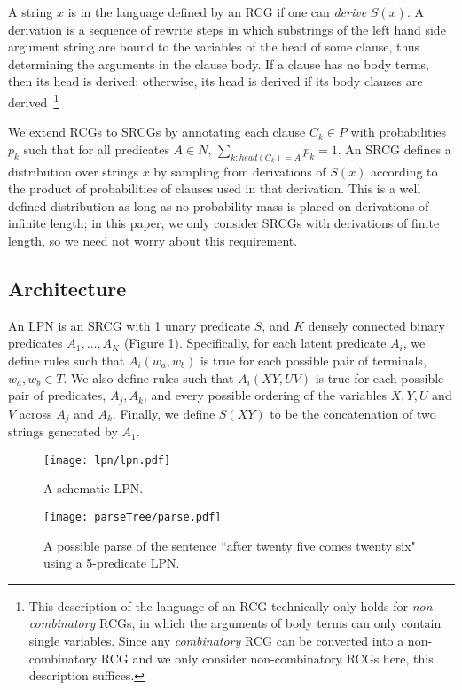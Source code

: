 \documentclass[11pt, twocolumn]{article}
\begin{document}
A string $x$ is in the language defined by an RCG if one can
\emph{derive} $S(x)$. A derivation is a sequence of rewrite steps in
which substrings of the left hand side argument string are bound to
the variables of the head of some clause, thus determining the
arguments in the clause body. If a clause has no body terms, then its
head is derived; otherwise, its head is derived if its body clauses
are derived~\footnote{This description of the language of an RCG
  technically only holds for \emph{non-combinatory} RCGs, in which the
  arguments of body terms can only contain single variables. Since any
  \emph{combinatory} RCG can be converted into a non-combinatory RCG
  and we only consider non-combinatory RCGs here, this description
  suffices.}

We extend RCGs to SRCGs by annotating each clause $C_k \in P$ with
probabilities $p_k$ such that for all predicates ${A \in N, \,
  \sum_{k:head(C_k)=A} p_k = 1}$. An SRCG defines a distribution over
strings $x$ by sampling from derivations of $S(x)$ according to the
product of probabilities of clauses used in that derivation. This is a
well defined distribution as long as no probability mass is placed on
derivations of infinite length; in this paper, we only consider SRCGs
with derivations of finite length, so we need not worry about this
requirement.

\subsection{Architecture}

An LPN is an SRCG with 1 unary predicate $S$, and $K$ densely
connected binary predicates $A_1, \dots, A_K$ (Figure
\ref{fig:architecture}).  Specifically, for each latent predicate
$A_i$, we define rules such that $A_i(w_a,w_b)$ is true for each
possible pair of terminals, $w_a,w_b \in T$. We also define rules such
that $A_i(XY,UV)$ is true for each possible pair of predicates,
$A_j,A_k$, and every possible ordering of the variables $X,Y,U$ and
$V$ across $A_j$ and $A_k$. Finally, we define $S(XY)$ to be the
concatenation of two strings generated by $A_1$.
 
\begin{figure}[t]
		\texttt{[image: lpn/lpn.pdf]}
		\caption{A schematic LPN.}
		\label{fig:architecture}
\end{figure}

\begin{figure}[t]
		\texttt{[image: parseTree/parse.pdf]}
		\caption{A possible parse of the sentence ``after twenty five comes twenty six" using a 5-predicate LPN.}
\end{figure}
\end{document}

